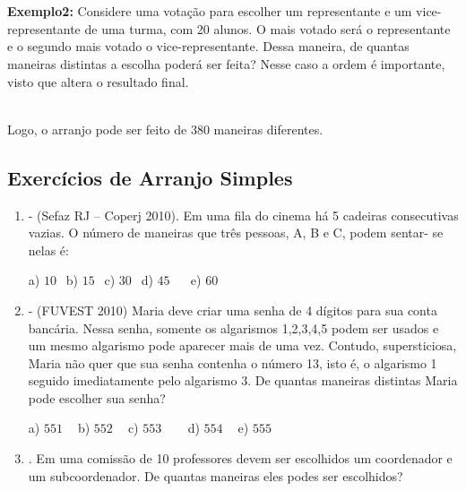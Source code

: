 \begin{multicols*}{2}
\\

\\

\textbf{Exemplo2: } Considere uma votação para escolher um representante e um vice-representante de uma turma, com 20 alunos. O mais votado será o representante e o segundo mais votado o vice-representante. Dessa maneira, de quantas maneiras distintas a escolha poderá ser feita? Nesse caso a ordem é importante, visto que altera o resultado final.


\\

Logo, o arranjo pode ser feito de 380 maneiras diferentes.

\subsection{Exercícios de Arranjo Simples}

		\begin{enumerate}

		\item - (Sefaz RJ – Coperj 2010). Em uma fila do cinema há 5 cadeiras consecutivas
vazias. O número de maneiras que três pessoas, A, B e C, podem sentar- se nelas é:

	a) $10 \ \ $ b) $15 \ \ $ c) $30 \ \ $ d) $45 \ \ \ \ \ \ $ e) $60 \ \ $

		\item - (FUVEST 2010) Maria deve criar uma senha de 4 dígitos para sua conta bancária.
Nessa senha, somente os algarismos 1,2,3,4,5 podem ser usados e um mesmo algarismo pode
aparecer mais de uma vez. Contudo, supersticiosa, Maria não quer que sua senha contenha o
número 13, isto é, o algarismo 1 seguido imediatamente pelo algarismo 3. De quantas maneiras
distintas Maria pode escolher sua senha?

	a) $551 \ \ \ \ $ b) $552 \ \ \ \ $ c) $553 \ \ \ \ \ \ \ \ $ d) $554 \ \ \ \ $ e) $555 \ \ $

		\item . Em uma comissão de 10 professores devem ser escolhidos um coordenador e um subcoordenador. De quantas maneiras eles podes ser escolhidos?
		

\end{enumerate}
\end{multicols*}
